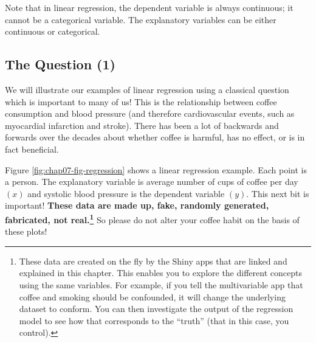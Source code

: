 \documentclass[
  12pt,
  krantz2]{krantz}
\begin{document}
Note that in linear regression, the dependent variable is always continuous; it cannot be a categorical variable.
The explanatory variables can be either continuous or categorical.

\hypertarget{the-question-1}{%
\subsection{The Question (1)}\label{the-question-1}}

We will illustrate our examples of linear regression using a classical question which is important to many of us!
This is the relationship between coffee consumption and blood pressure (and therefore cardiovascular events, such as myocardial infarction and stroke).
There has been a lot of backwards and forwards over the decades about whether coffee is harmful, has no effect, or is in fact beneficial.

Figure \ref{fig:chap07-fig-regression} shows a linear regression example.
Each point is a person.
The explanatory variable is average number of cups of coffee per day \((x)\) and systolic blood pressure is the dependent variable \((y)\).
This next bit is important!
\textbf{These data are made up, fake, randomly generated, fabricated, not real.\footnote{These data are created on the fly by the Shiny apps that are linked and explained in this chapter. This enables you to explore the different concepts using the same variables.
  For example, if you tell the multivariable app that coffee and smoking should be confounded, it will change the underlying dataset to conform.
  You can then investigate the output of the regression model to see how that corresponds to the ``truth'' (that in this case, you control).}}
So please do not alter your coffee habit on the basis of these plots!
\end{document}

